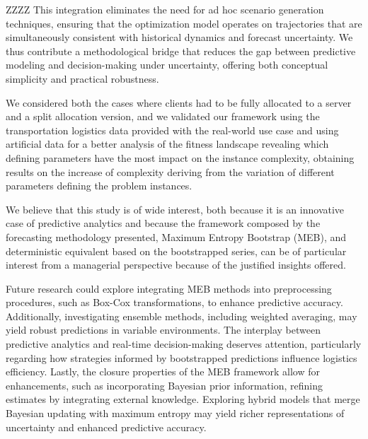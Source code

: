 \documentclass[ijoc,sglanonrev]{informs4}
\begin{document}
ZZZZ This integration eliminates the need for ad hoc scenario generation techniques, ensuring that the optimization model operates on trajectories that are simultaneously consistent with historical dynamics and forecast uncertainty. We thus contribute a methodological bridge that reduces the gap between predictive modeling and decision-making under uncertainty, offering both conceptual simplicity and practical robustness.

We considered both the cases where clients had to be fully allocated to a server and a split allocation version, and we  validated our framework using the transportation logistics data provided with the real-world use case and using artificial data for a better analysis of the fitness landscape revealing which defining parameters have the most impact on the instance complexity, obtaining results on the increase of complexity deriving from the variation of different parameters defining the problem instances.

We believe that this study is of wide interest, both because it is an innovative case of predictive analytics and because the framework composed by the forecasting methodology presented, Maximum Entropy Bootstrap (MEB), and deterministic equivalent based on the bootstrapped series, can be of particular interest from a managerial perspective because of the justified insights offered.

Future research could explore integrating MEB methods into preprocessing procedures, such as Box-Cox transformations, to enhance predictive accuracy. Additionally, investigating ensemble methods, including weighted averaging, may yield robust predictions in variable environments. The interplay between predictive analytics and real-time decision-making deserves attention, particularly regarding how strategies informed by bootstrapped predictions influence logistics efficiency. Lastly, the closure properties of the MEB framework allow for enhancements, such as incorporating Bayesian prior information, refining estimates by integrating external knowledge. Exploring hybrid models that merge Bayesian updating with maximum entropy may yield richer representations of uncertainty and enhanced predictive accuracy.

\end{document}
